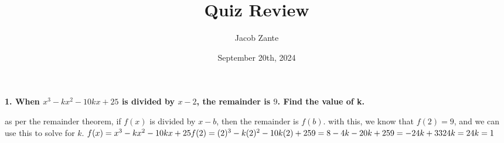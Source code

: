\documentclass[14pt, a4paper]{extarticle}
\title{Quiz Review}
\author{Jacob Zante}
\date{September 20th, 2024}
\begin{document}
\maketitle
\setlength{\parindent}{0pt}

\textbf{1. When $x^3 - kx^2 - 10kx + 25$ is divided by $x - 2$, the remainder is $9$. 
Find the value of k.}
\begin{adjustwidth}{1cm}{0pt}
    as per the remainder theorem, if $f(x)$ is divided by $x - b$, then the remainder
    is $f(b)$. with this, we know that $f(2) = 9$, and we can use this to solve for $k$.
    \begin{math}
        f(x) = x^3 - kx^2 - 10kx + 25 \\
        f(2) = (2)^3 - k(2)^2 - 10k(2) + 25 \\
        9 = 8 - 4k - 20k + 25 \\
        9 = -24k + 33 \\
        24k = 24 \\
        k = 1 \\
    \end{math}
\end{adjustwidth}
\end{document}
